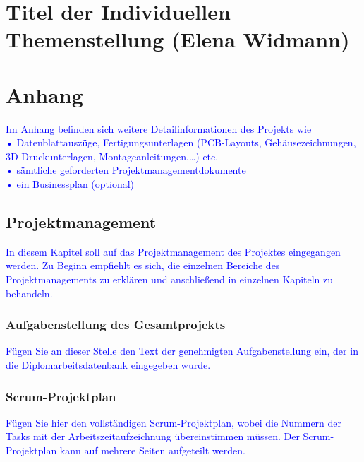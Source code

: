 \documentclass[12pt]{article}
\begin{document}
\newpage
\section{Titel der Individuellen Themenstellung (Elena Widmann)}

\newpage
\section{Anhang}
\textcolor{blue}{Im Anhang befinden sich weitere Detailinformationen des Projekts wie\\
•	Datenblattauszüge, Fertigungsunterlagen (PCB-Layouts, Gehäusezeichnungen, 3D-Druckunterlagen, Montageanleitungen,…) etc.\\
•	sämtliche geforderten Projektmanagementdokumente\\
•	ein Businessplan (optional)
}

\subsection{Projektmanagement}
\textcolor{blue}{In diesem Kapitel soll auf das Projektmanagement des Projektes eingegangen werden. Zu Beginn empfiehlt es sich, die einzelnen Bereiche des Projektmanagements zu erklären und anschließend in einzelnen Kapiteln zu behandeln.}

\subsubsection{Aufgabenstellung des Gesamtprojekts}
\textcolor{blue}{Fügen Sie an dieser Stelle den Text der genehmigten Aufgabenstellung ein, der in die Diplomarbeitsdatenbank  eingegeben wurde.}

\subsubsection{Scrum-Projektplan}
\textcolor{blue}{Fügen Sie hier den vollständigen Scrum-Projektplan, wobei die Nummern der Tasks mit der Arbeitszeitaufzeichnung übereinstimmen müssen. Der Scrum-Projektplan kann auf mehrere Seiten aufgeteilt werden.}
\end{document}
